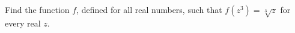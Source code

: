 Find the function $f$, defined for all real numbers, such that $f\left(z^3\right)=\sqrt[3]{z}$ for every real $z$.

